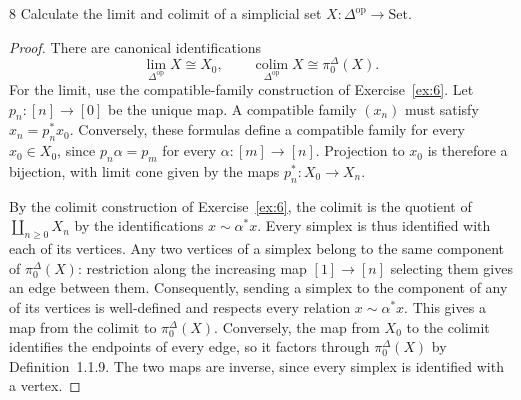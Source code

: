 \begin{exercise}{8}
Calculate the limit and colimit of a simplicial set
$X\colon\Delta^{\mathrm{op}}\to\mathrm{Set}$.

\begin{proof}
There are canonical identifications
\[
 \lim_{\Delta^{\mathrm{op}}}X\cong X_0,
 \qquad
 \operatorname*{colim}_{\Delta^{\mathrm{op}}}X\cong\pi_0^\Delta(X).
\]
For the limit, use the compatible-family construction of
Exercise~\ref{ex:6}. Let $p_n\colon[n]\to[0]$ be the unique map.
A compatible family $(x_n)$ must satisfy $x_n=p_n^*x_0$.
Conversely, these formulas define a compatible family for every
$x_0\in X_0$, since $p_n\alpha=p_m$ for every
$\alpha\colon[m]\to[n]$. Projection to $x_0$ is therefore a
bijection, with limit cone given by the maps $p_n^*\colon X_0\to X_n$.

By the colimit construction of Exercise~\ref{ex:6}, the colimit is the
quotient of $\coprod_{n\ge0}X_n$ by the identifications
$x\sim\alpha^*x$. Every simplex is thus identified with each of its
vertices. Any two vertices of a simplex belong to the same component
of $\pi_0^\Delta(X)$: restriction along the increasing map
$[1]\to[n]$ selecting them gives an edge between them.
Consequently, sending a simplex to the component of any of its
vertices is well-defined and respects every relation
$x\sim\alpha^*x$. This gives a map from the colimit to
$\pi_0^\Delta(X)$.
Conversely, the map from $X_0$ to the colimit identifies the endpoints
of every edge, so it factors through $\pi_0^\Delta(X)$ by
Definition~1.1.9. The two maps are inverse, since every simplex is
identified with a vertex.
\end{proof}
\end{exercise}
